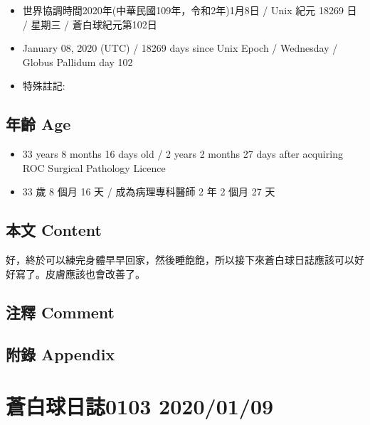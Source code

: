 \documentclass[
]{article}
\providecommand{\tightlist}{%
  \setlength{\itemsep}{0pt}\setlength{\parskip}{0pt}}
\begin{document}
\begin{itemize}
\tightlist
\item
  世界協調時間2020年(中華民國109年，令和2年)1月8日 / Unix 紀元 18269 日
  / 星期三 / 蒼白球紀元第102日
\item
  January 08, 2020 (UTC) / 18269 days since Unix Epoch / Wednesday /
  Globus Pallidum day 102
\item
  特殊註記:
\end{itemize}

\hypertarget{ux5e74ux9f61-age-7}{%
\subsection{年齡 Age}\label{ux5e74ux9f61-age-7}}

\begin{itemize}
\tightlist
\item
  33 years 8 months 16 days old / 2 years 2 months 27 days after
  acquiring ROC Surgical Pathology Licence
\item
  33 歲 8 個月 16 天 / 成為病理專科醫師 2 年 2 個月 27 天
\end{itemize}

\hypertarget{ux672cux6587-content-7}{%
\subsection{本文 Content}\label{ux672cux6587-content-7}}

好，終於可以練完身體早早回家，然後睡飽飽，所以接下來蒼白球日誌應該可以好好寫了。皮膚應該也會改善了。

\hypertarget{ux6ce8ux91cb-comment-7}{%
\subsection{注釋 Comment}\label{ux6ce8ux91cb-comment-7}}

\hypertarget{ux9644ux9304-appendix-7}{%
\subsection{附錄 Appendix}\label{ux9644ux9304-appendix-7}}

\hypertarget{ux84bcux767dux7403ux65e5ux8a8c0103-20200109}{%
\section{蒼白球日誌0103
2020/01/09}\label{ux84bcux767dux7403ux65e5ux8a8c0103-20200109}}
\end{document}
